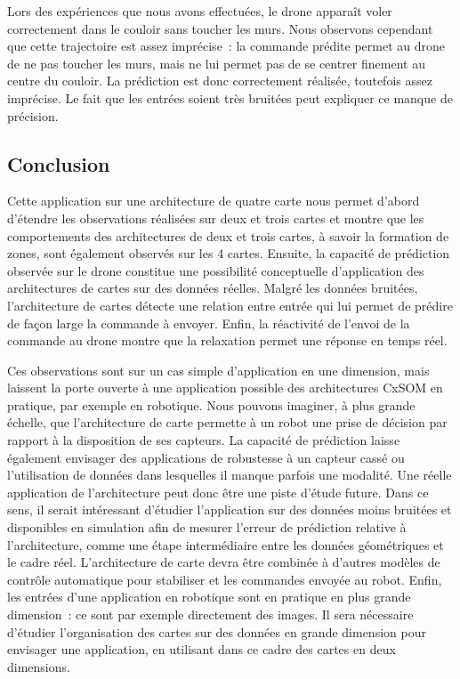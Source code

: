 \documentclass[../main]{subfiles}
\begin{document}
Lors des expériences que nous avons effectuées, le drone apparaît voler correctement dans le couloir sans toucher les murs. Nous observons cependant que cette trajectoire est assez imprécise~: la commande prédite permet au drone de ne pas toucher les murs, mais ne lui permet pas de se centrer finement au centre du couloir.
La prédiction est donc correctement réalisée, toutefois assez imprécise. 
Le fait que les entrées soient très bruitées peut expliquer ce manque de précision. 

\subsection{Conclusion}

Cette application sur une architecture de quatre carte nous permet d'abord d'étendre les observations réalisées sur deux et trois cartes et montre que les comportements des architectures de deux et trois cartes, à savoir la formation de zones, sont également observés sur les 4 cartes.
Ensuite, la capacité de prédiction observée sur le drone constitue une possibilité conceptuelle d'application des architectures de cartes sur des données réelles. 
Malgré les données bruitées, l'architecture de cartes détecte une relation entre entrée qui lui permet de prédire de façon large la commande à envoyer.
Enfin, la réactivité de l'envoi de la commande au drone montre que la relaxation permet une réponse en temps réel.


Ces observations sont sur un cas simple d'application en une dimension, mais laissent la porte ouverte à une application possible des architectures CxSOM en pratique, par exemple en robotique. 
Nous pouvons imaginer, à plus grande échelle, que l'architecture de carte permette à un robot une prise de décision par rapport à la disposition de ses capteurs. La capacité de prédiction laisse également envisager des applications de robustesse à un capteur cassé ou l'utilisation de données dans lesquelles il manque parfois une modalité.
Une réelle application de l'architecture peut donc être une piste d'étude future.
Dans ce sens, il serait intéressant d'étudier l'application sur des données moins bruitées et disponibles en simulation afin de mesurer l'erreur de prédiction relative à l'architecture, comme une étape intermédiaire entre les données géométriques et le cadre réel. 
L'architecture de carte devra être combinée à d'autres modèles de contrôle automatique pour stabiliser et les commandes envoyée au robot.
Enfin, les entrées d'une application en robotique sont en pratique en plus grande dimension~: ce sont par exemple directement des images. Il sera nécessaire d'étudier l'organisation des cartes sur des données en grande dimension pour envisager une application, en utilisant dans ce cadre des cartes en deux dimensions.
\end{document}
